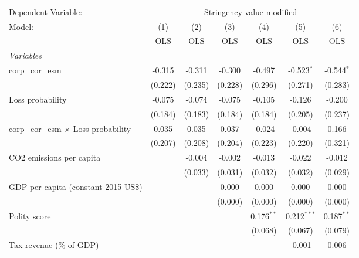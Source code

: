 
\begingroup
\centering
\begin{tabular}{lcccccc}
   \toprule
   Dependent Variable: & \multicolumn{6}{c}{Stringency value modified}\\
   Model:                                      & (1)     & (2)     & (3)     & (4)          & (5)           & (6)\\  
                                               &  OLS    & OLS     & OLS     & OLS          & OLS           & OLS\\  
   \midrule
   \emph{Variables}\\
   corp\_cor\_esm                              & -0.315  & -0.311  & -0.300  & -0.497       & -0.523$^{*}$  & -0.544$^{*}$\\   
                                               & (0.222) & (0.235) & (0.228) & (0.296)      & (0.271)       & (0.283)\\   
   Loss probability                            & -0.075  & -0.074  & -0.075  & -0.105       & -0.126        & -0.200\\   
                                               & (0.184) & (0.183) & (0.184) & (0.184)      & (0.205)       & (0.237)\\   
   corp\_cor\_esm $\times$ Loss probability    & 0.035   & 0.035   & 0.037   & -0.024       & -0.004        & 0.166\\   
                                               & (0.207) & (0.208) & (0.204) & (0.223)      & (0.220)       & (0.321)\\   
   CO2 emissions per capita                    &         & -0.004  & -0.002  & -0.013       & -0.022        & -0.012\\   
                                               &         & (0.033) & (0.031) & (0.032)      & (0.032)       & (0.029)\\   
   GDP per capita (constant 2015 US\$)         &         &         & 0.000   & 0.000        & 0.000         & 0.000\\   
                                               &         &         & (0.000) & (0.000)      & (0.000)       & (0.000)\\   
   Polity score                                &         &         &         & 0.176$^{**}$ & 0.212$^{***}$ & 0.187$^{**}$\\   
                                               &         &         &         & (0.068)      & (0.067)       & (0.079)\\   
   Tax revenue (\% of GDP)                     &         &         &         &              & -0.001        & 0.006\\   

\end{tabular}
